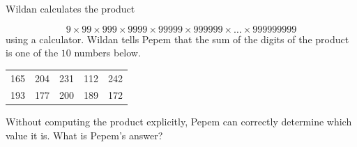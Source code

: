Wildan calculates the product

\[
9 \times 99\times 999\times 9999\times 99999\times 999999\times \ldots \times 999999999
\]using a calculator. Wildan tells Pepem that the sum of the digits of the product is one  of the $10$ numbers below.

\begin{tabular}{ccccc}
165 & 204 & 231 & 112 & 242 \\
193 & 177 & 200 & 189 & 172
\end{tabular}Without computing the product explicitly, Pepem can correctly determine which value it is. What is Pepem's answer?
